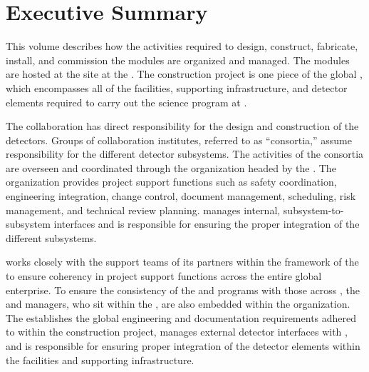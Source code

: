 \chapter{Executive Summary}

\label{vl:tc-execsum}




This volume describes how the activities required to design,
construct, fabricate, install, and commission the 
 modules are organized and managed. The  modules
are hosted at the  site at the . The
  construction project is one piece of the
global , which encompasses all of the facilities,
supporting infrastructure, and detector elements required to carry out
the  science program at .
      
The  collaboration has direct responsibility for the design 
and construction of the  detectors.  Groups of collaboration 
institutes, referred to as ``consortia,'' assume responsibility for 
the different detector subsystems.  The activities of the consortia are 
overseen and coordinated through the   organization 
headed by the  .  The  organization 
provides project support functions such as safety coordination, 
engineering integration, change control, document management, scheduling, 
risk management, and technical review planning.    
manages internal, subsystem-to-subsystem interfaces and is responsible 
for ensuring the proper integration of the different subsystems.   

  works closely with the support teams of its 
 partners within the framework of the  to 
ensure coherency in project support functions across the entire global 
enterprise.  To ensure the consistency of the   
and  programs with those across , the 
  and  managers, who sit within 
the , are also embedded within the   
organization.  The  establishes the global engineering
and documentation requirements adhered to within the  
 construction project, manages external  detector 
interfaces with , and is responsible for ensuring proper 
integration of the  detector elements within the facilities 
and supporting infrastructure.  

